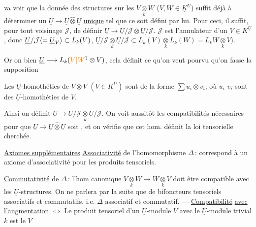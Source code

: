 va voir que la donnée des structures  sur les
$V\underset{k}{\otimes}W$ ($V,W\in\underline K^U$) suffit déjà à déterminer
un $\underline U\longrightarrow\underline U\mathbin{\widehat\otimes}\underline U$ \uline{unique} tel que ce soit défini
par lui. Pour ceci, il suffit, pour tout
voisinage $\mathcal J$, de  définir
$\underline U\longrightarrow\underline U/\mathcal J\otimes\underline U/\mathcal J$.  $\mathcal J$ est l'annulateur
d'un $V\in K^{\underline U}$, donc $\underline U/\mathcal J\inserted{={}\underline U_V}\subset L_k(V)$,
$\underline U/\mathcal J\underset{k}{\otimes}\underline U/\mathcal J\subset L_k(V)\underset{k}{\otimes}L_k(W)=L_k W\underset{k}{\otimes}V)$.

 Or on  bien
$\underline U\longrightarrow L_k(\unsure{V|W}\otimes V)$, cela définit ce qu'on veut
pourvu qu'on fasse la supposition

Les $\underline U$-homothéties de $V\otimes V$
$(V\in K^{\underline U})$ sont de la forme $\sum u_i\otimes v_i$,
où $u_i$ $v_i$ sont des $\underline U$-homothéties
de $V$.

Ainsi on définit $\underline U\longrightarrow\underline U/\mathcal J\underset{k}{\otimes}\underline U/\mathcal J$.
On voit aussitôt les compatibilités
nécessaires pour que $\underline U\longrightarrow\underline U\mathbin{\widehat\otimes}\underline U$ soit
, et on vérifie que cet hom.
définit la loi tensorielle cherchée.

\uline{Axiomes supplémentaires} \uline{Associativité} de
l'homomorphisme $\Delta$\,: correspond à un axiome
d'associativité pour les produits tensoriels.

\uline{Commutativité} de $\Delta$\,: l'hom canonique
$V\underset{k}{\otimes}W\longrightarrow W\underset{k}{\otimes}V$ doit être compatible
avec les $\underline U$-structures. On ne
parlera par la suite que de bifoncteurs
tensoriels associatifs et commutatifs, i.e. $\Delta$
associatif et commutatif. --- \uline{Compatibilité}
\uline{avec l'augmentation}  $\Longleftrightarrow$ Le produit tensoriel
d'un $\underline U$-module $V$ avec le $\underline U$-module
trivial $k$ est le  $V$

